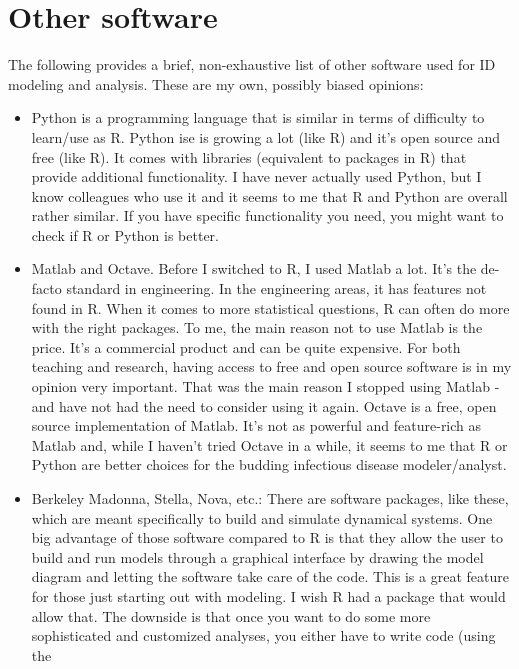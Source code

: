 \documentclass[]{book}
\theoremstyle{definition}
\theoremstyle{definition}
\theoremstyle{definition}
\theoremstyle{remark}
\begin{document}
\section{Other software}\label{other-software}

The following provides a brief, non-exhaustive list of other software
used for ID modeling and analysis. These are my own, possibly biased
opinions:

\begin{itemize}
\item
  Python is a programming language that is similar in terms of
  difficulty to learn/use as R. Python ise is growing a lot (like R) and
  it's open source and free (like R). It comes with libraries
  (equivalent to packages in R) that provide additional functionality. I
  have never actually used Python, but I know colleagues who use it and
  it seems to me that R and Python are overall rather similar. If you
  have specific functionality you need, you might want to check if R or
  Python is better.
\item
  Matlab and Octave. Before I switched to R, I used Matlab a lot. It's
  the de-facto standard in engineering. In the engineering areas, it has
  features not found in R. When it comes to more statistical questions,
  R can often do more with the right packages. To me, the main reason
  not to use Matlab is the price. It's a commercial product and can be
  quite expensive. For both teaching and research, having access to free
  and open source software is in my opinion very important. That was the
  main reason I stopped using Matlab - and have not had the need to
  consider using it again. Octave is a free, open source implementation
  of Matlab. It's not as powerful and feature-rich as Matlab and, while
  I haven't tried Octave in a while, it seems to me that R or Python are
  better choices for the budding infectious disease modeler/analyst.
\item
  Berkeley Madonna, Stella, Nova, etc.: There are software packages,
  like these, which are meant specifically to build and simulate
  dynamical systems. One big advantage of those software compared to R
  is that they allow the user to build and run models through a
  graphical interface by drawing the model diagram and letting the
  software take care of the code. This is a great feature for those just
  starting out with modeling. I wish R had a package that would allow
  that. The downside is that once you want to do some more sophisticated
  and customized analyses, you either have to write code (using the

\end{itemize}
\end{document}
